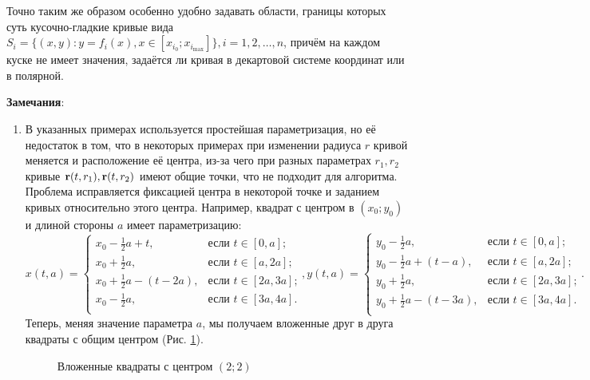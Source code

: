 \documentclass[a4paper]{article}
\begin{document}
Точно таким же образом особенно удобно задавать области, границы которых суть кусочно-гладкие кривые вида $S_i=\{(x,y): y=f_i(x), x \in [x_{i_0};x_{i_{\max}}]\}, i=1,2,\dots, n$, причём на каждом куске не имеет значения, задаётся ли кривая в декартовой системе координат или в полярной.

{\bf Замечания}:
\begin{enumerate}
  \item В указанных примерах используется простейшая параметризация, но её недостаток в том, что в некоторых примерах при изменении радиуса $r$ кривой меняется и расположение её центра, из-за чего при разных параметрах $r_1,r_2$ кривые ${\bf r}(t,r_1),{\bf r}(t,r_2)$ имеют общие точки, что не подходит для алгоритма.
Проблема исправляется фиксацией центра в некоторой точке и заданием кривых относительно этого центра. Например, квадрат с центром в $(x_0;y_0)$ и длиной стороны $a$ имеет параметризацию:
\[
x(t,a) =
\begin{cases}
x_0-\frac{1}{2}a+t, & \text{если $t \in [0,a]$;} \\
x_0+\frac{1}{2}a, & \text{если $t \in [a,2a]$;} \\
x_0+\frac{1}{2}a-(t-2a), & \text{если $t \in [2a,3a]$;} \\
x_0-\frac{1}{2}a, & \text{если $t \in [3a,4a]$.} \\
\end{cases},
y(t,a) =
\begin{cases}
y_0-\frac{1}{2}a, & \text{если $t \in [0,a]$;} \\
y_0-\frac{1}{2}a+(t-a), & \text{если $t \in [a,2a]$;} \\
y_0+\frac{1}{2}a, & \text{если $t \in [2a,3a]$;} \\
y_0+\frac{1}{2}a-(t-3a), & \text{если $t \in [3a,4a]$.} \\
\end{cases}.
\]
Теперь, меняя значение параметра $a$, мы получаем вложенные друг в друга квадраты с общим центром (Рис. \ref{rects}).
\begin{figure}[h!]
  \noindent{}
  \caption{Вложенные квадраты с центром $(2;2)$}
  \label{rects}
  \end{figure}
  

\end{enumerate}
\end{document}

